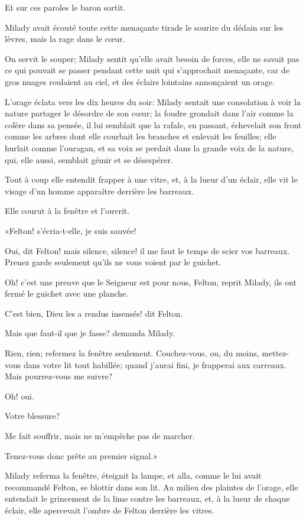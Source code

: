 Et sur ces paroles le baron sortit. 

Milady avait écouté toute cette menaçante tirade le sourire du dédain sur les lèvres, mais la rage dans le cœur. 

On servit le souper; Milady sentit qu'elle avait besoin de forces, elle ne savait pas ce qui pouvait se passer pendant cette nuit qui s'approchait menaçante, car de gros nuages roulaient au ciel, et des éclairs lointains annonçaient un orage. 

L'orage éclata vers les dix heures du soir: Milady sentait une consolation à voir la nature partager le désordre de son cœur; la foudre grondait dans l'air comme la colère dans sa pensée, il lui semblait que la rafale, en passant, échevelait son front comme les arbres dont elle courbait les branches et enlevait les feuilles; elle hurlait comme l'ouragan, et sa voix se perdait dans la grande voix de la nature, qui, elle aussi, semblait gémir et se désespérer. 

Tout à coup elle entendit frapper à une vitre, et, à la lueur d'un éclair, elle vit le visage d'un homme apparaître derrière les barreaux. 

Elle courut à la fenêtre et l'ouvrit. 

«Felton! s'écria-t-elle, je suis sauvée! 

\speak  Oui, dit Felton! mais silence, silence! il me faut le temps de scier vos barreaux. Prenez garde seulement qu'ils ne vous voient par le guichet. 

\speak  Oh! c'est une preuve que le Seigneur est pour nous, Felton, reprit Milady, ils ont fermé le guichet avec une planche. 

\speak  C'est bien, Dieu les a rendus insensés! dit Felton. 

\speak  Mais que faut-il que je fasse? demanda Milady. 

\speak  Rien, rien; refermez la fenêtre seulement. Couchez-vous, ou, du moins, mettez-vous dans votre lit tout habillée; quand j'aurai fini, je frapperai aux carreaux. Mais pourrez-vous me suivre? 

\speak  Oh! oui. 

\speak  Votre blessure? 

\speak  Me fait souffrir, mais ne m'empêche pas de marcher. 

\speak  Tenez-vous donc prête au premier signal.» 

Milady referma la fenêtre, éteignit la lampe, et alla, comme le lui avait recommandé Felton, se blottir dans son lit. Au milieu des plaintes de l'orage, elle entendait le grincement de la lime contre les barreaux, et, à la lueur de chaque éclair, elle apercevait l'ombre de Felton derrière les vitres. 

